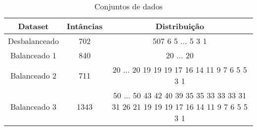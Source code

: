 
\begin{table}[h!]
  \begin{center}
    \begin{tabular}{ccc}
      \hline
      Dataset & Intâncias & Distribuição \\
      \hline

      Desbalanceado & 702 & 507 6 5 ... 5 3 1 \\
      Balanceado 1 & 840 & 20 ... 20 \\
      Balanceado 2 & 711 & 20 ... 20 19 19 19 17 16 14 11 9 7 6 5 5 3 1 \\
      Balanceado 3 & 1343 & 50 ... 50 43 42 40 39 35 35 33 33 33 31 31 26 21 19 19 19 17 16 14 11 9 7 6 5 5 3 1 \\

      \hline
    \end{tabular}
    \caption{Conjuntos de dados}
    \label{tab:balanceadovsdesbalanceado}
  \end{center}
\end{table}

